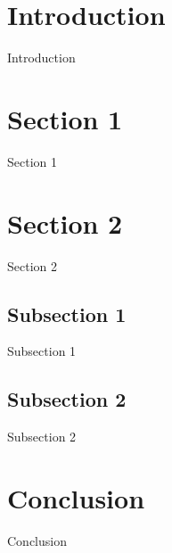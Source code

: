 \documentclass[conference]{IEEEtran}
\begin{document}
\section{Introduction}
Introduction

\section{Section 1}
Section 1

\section{Section 2}
Section 2
\subsection{Subsection 1}
Subsection 1
\subsection{Subsection 2 }
Subsection 2

\section{Conclusion}
Conclusion
\end{document}

